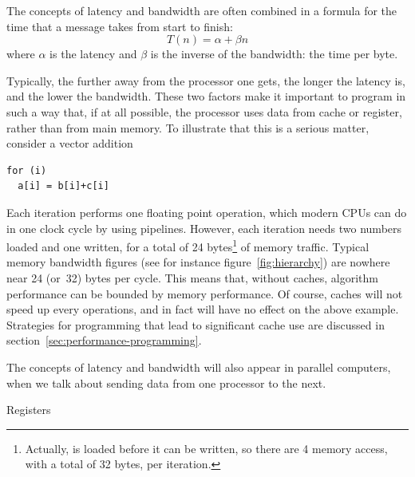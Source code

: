 The concepts of latency and bandwidth are often combined in a formula
for the time that a message takes from start to finish:
\[ T(n) = \alpha+\beta n \]
where $\alpha$ is the latency and $\beta$ is the inverse of the
bandwidth: the time per byte.

Typically, the further away from the processor one gets, the longer
the latency is, and the lower the bandwidth.
These two factors make it important to program in such a
way that, if at all possible, the processor uses data from cache or register,
rather than from main memory. To illustrate that this is a serious
matter, consider a vector addition
\begin{verbatim}
for (i)
  a[i] = b[i]+c[i]
\end{verbatim}
Each iteration performs one floating point operation, which modern
CPUs can do in one clock cycle by using pipelines. However, each
iteration needs two numbers loaded and one written, for a total of 24
bytes\footnote{Actually,  is loaded before it can be written,
so there are 4 memory access, with a total of 32 bytes, per
iteration.} of memory traffic. Typical memory bandwidth figures (see
for instance figure~\ref{fig:hierarchy}) are nowhere near 24 (or~32) bytes per
cycle. This means that, without caches, algorithm performance can be
bounded by memory performance. Of course, caches will not speed up
every operations, and in fact will have no effect on the above
example. Strategies for programming that lead to significant cache use
are discussed in section~\ref{sec:performance-programming}.

The concepts of latency and bandwidth will also appear in parallel
computers, when we talk about sending data from one processor to the
next.

 {Registers}

